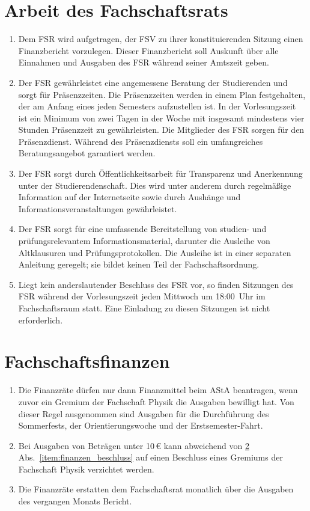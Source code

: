 \section{Arbeit des Fachschaftsrats}
\begin{enumerate}
	\item Dem FSR wird aufgetragen, der FSV zu ihrer konstituierenden Sitzung einen Finanzbericht vorzulegen.
	Dieser Finanzbericht soll Auskunft über alle Einnahmen und Ausgaben des FSR während seiner Amtszeit geben.
	\item Der FSR gewährleistet eine angemessene Beratung der Studierenden und sorgt für Präsenzzeiten.
	Die Präsenzzeiten werden in einem Plan festgehalten, der am Anfang eines jeden Semesters aufzustellen ist.
	In der Vorlesungszeit ist ein Minimum von zwei Tagen in der Woche mit insgesamt mindestens vier Stunden Präsenzzeit zu gewährleisten.
	Die Mitglieder des FSR sorgen für den Präsenzdienst.
	Während des Präsenzdiensts soll ein umfangreiches Beratungsangebot garantiert werden.
	\item Der FSR sorgt durch Öffentlichkeitsarbeit für Transparenz und Anerkennung unter der Studierendenschaft.
	Dies wird unter anderem durch regelmäßige Information auf der Internetseite sowie durch Aushänge und Informationsveranstaltungen gewährleistet.
	\item Der FSR sorgt für eine umfassende Bereitstellung von studien- und prüfungsrelevantem Informationsmaterial, darunter die Ausleihe von Altklausuren und Prüfungsprotokollen.
	Die Ausleihe ist in einer separaten Anleitung geregelt; sie bildet keinen Teil der Fachschaftsordnung.
	\item Liegt kein anderslautender Beschluss des FSR vor, so finden Sitzungen des FSR während der Vorlesungszeit jeden Mittwoch um 18:00~Uhr im Fachschaftsraum statt.
	Eine Einladung zu diesen Sitzungen ist nicht erforderlich.
\end{enumerate}

\section{Fachschaftsfinanzen}
\label{sec:finanzen}
\begin{enumerate}
	\item \label{item:finanzen_beschluss}
Die Finanzräte dürfen nur dann Finanzmittel beim AStA beantragen, wenn zuvor ein Gremium der Fachschaft Physik die Ausgaben bewilligt hat.
	Von dieser Regel ausgenommen sind Ausgaben für die Durchführung des Sommerfests, der Orientierungswoche und der Erstsemester-Fahrt.
	\item Bei Ausgaben von Beträgen unter 10\,€ kann abweichend von \ref{sec:finanzen} Abs.~\ref{item:finanzen_beschluss} auf einen Beschluss eines Gremiums der Fachschaft Physik verzichtet werden. 
	\item Die Finanzräte erstatten dem Fachschaftsrat monatlich über die Ausgaben des vergangen Monats Bericht.
\end{enumerate}

